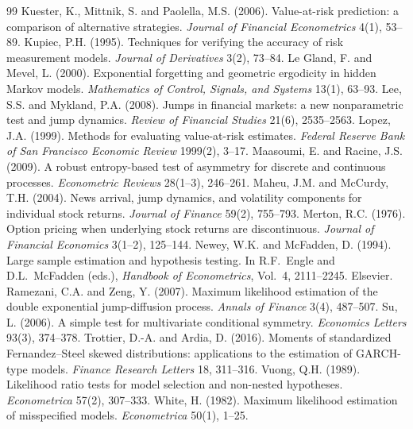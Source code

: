 \documentclass[11pt,a4paper]{article}
\theoremstyle{definition}
\theoremstyle{remark}
\begin{document}
\begin{thebibliography}{99}
 Kuester, K., Mittnik, S. and Paolella, M.S. (2006). Value-at-risk prediction: a comparison of alternative strategies. \emph{Journal of Financial Econometrics} 4(1), 53--89.
 Kupiec, P.H. (1995). Techniques for verifying the accuracy of risk measurement models. \emph{Journal of Derivatives} 3(2), 73--84.
 Le Gland, F. and Mevel, L. (2000). Exponential forgetting and geometric ergodicity in hidden Markov models. \emph{Mathematics of Control, Signals, and Systems} 13(1), 63--93.
 Lee, S.S. and Mykland, P.A. (2008). Jumps in financial markets: a new nonparametric test and jump dynamics. \emph{Review of Financial Studies} 21(6), 2535--2563.
 Lopez, J.A. (1999). Methods for evaluating value-at-risk estimates. \emph{Federal Reserve Bank of San Francisco Economic Review} 1999(2), 3--17.
 Maasoumi, E. and Racine, J.S. (2009). A robust entropy-based test of asymmetry for discrete and continuous processes. \emph{Econometric Reviews} 28(1--3), 246--261.
 Maheu, J.M. and McCurdy, T.H. (2004). News arrival, jump dynamics, and volatility components for individual stock returns. \emph{Journal of Finance} 59(2), 755--793.
 Merton, R.C. (1976). Option pricing when underlying stock returns are discontinuous. \emph{Journal of Financial Economics} 3(1--2), 125--144.
 Newey, W.K. and McFadden, D. (1994). Large sample estimation and hypothesis testing. In R.F.~Engle and D.L.~McFadden (eds.), \emph{Handbook of Econometrics}, Vol.~4, 2111--2245. Elsevier.
 Ramezani, C.A. and Zeng, Y. (2007). Maximum likelihood estimation of the double exponential jump-diffusion process. \emph{Annals of Finance} 3(4), 487--507.
 Su, L. (2006). A simple test for multivariate conditional symmetry. \emph{Economics Letters} 93(3), 374--378.
 Trottier, D.-A. and Ardia, D. (2016). Moments of standardized Fernandez--Steel skewed distributions: applications to the estimation of GARCH-type models. \emph{Finance Research Letters} 18, 311--316.
 Vuong, Q.H. (1989). Likelihood ratio tests for model selection and non-nested hypotheses. \emph{Econometrica} 57(2), 307--333.
 White, H. (1982). Maximum likelihood estimation of misspecified models. \emph{Econometrica} 50(1), 1--25.
\end{thebibliography}
\end{document}
